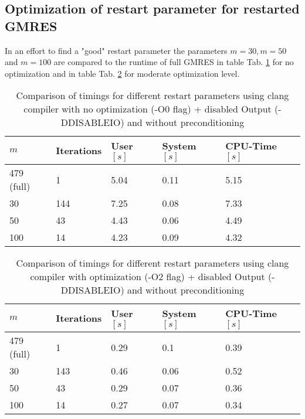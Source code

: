 \documentclass[11pt,a4paper]{article}
\newcommand{\refTab}[1]{Tab. \ref{#1}}
\begin{document}
\subsection{Optimization of restart parameter for restarted GMRES}
In an effort to find a "good" restart parameter the parameters $m=30, m=50$ and $m=100$ are compared to the runtime of full GMRES in table \refTab{tab:TimingsO0} for no optimization and in table \refTab{tab:TimingsO2} for moderate optimization level.
% 
\renewcommand{\arraystretch}{2}
\begin{table}[h!]
	\begin{center}
		\begin{tabular}{ p{2cm} p{2cm} p{1.5cm} p{1.8cm} p{2.5cm}}
			\hline
			\hline
			$m$ & Iterations & User $[s]$ & System $[s]$ & CPU-Time $[s]$ \\
			\hline
			\hline
			479 (full) & 1 & 5.04 & 0.11 & 5.15\\
			\hline
			\hline
			30 & 144 & 7.25 & 0.08 & 7.33\\
			\hline
			50 & 43 & 4.43 & 0.06 & 4.49\\
			\hline
			100 & 14 & 4.23 & 0.09 & 4.32\\
			\hline
			\hline
		\end{tabular}
		\caption{\label{tab:TimingsO0}  Comparison of timings for different restart parameters using clang compiler with no optimization (-O0 flag) + disabled Output (-DDISABLEIO) and without preconditioning}
	\end{center}
\end{table}
\renewcommand{\arraystretch}{1}
%
\renewcommand{\arraystretch}{2}
\begin{table}[h!]
	\begin{center}
		\begin{tabular}{ p{2cm} p{2cm} p{1.5cm} p{1.8cm} p{2.5cm}}
			\hline
			\hline
			$m$ & Iterations & User $[s]$ & System $[s]$ & CPU-Time $[s]$ \\
			\hline
			\hline
			479 (full) & 1 & 0.29 & 0.1 & 0.39\\
			\hline
			\hline
			30 & 143 & 0.46 & 0.06 & 0.52\\
			\hline
			50 & 43 & 0.29 & 0.07 & 0.36\\
			\hline
			100 & 14 & 0.27 & 0.07 & 0.34\\
			\hline
			\hline
		\end{tabular}
		\caption{\label{tab:TimingsO2}  Comparison of timings for different restart parameters using clang compiler with optimization (-O2 flag) + disabled Output (-DDISABLEIO) and without preconditioning}
	\end{center}
\end{table}
\end{document}
